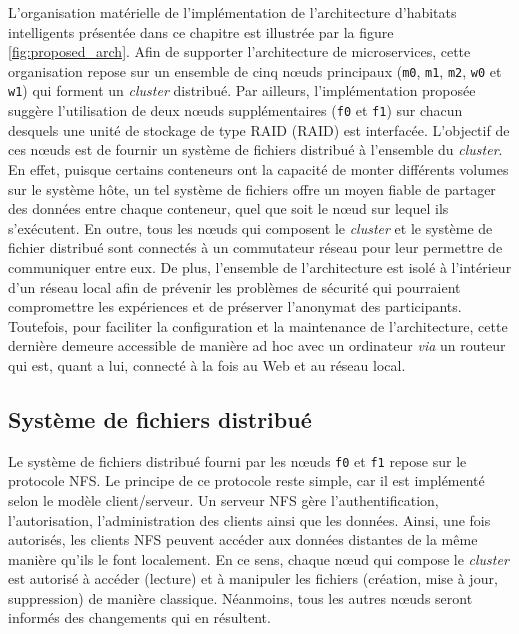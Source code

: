 L'organisation matérielle de l'implémentation de l'architecture d'habitats intelligents présentée dans ce chapitre est illustrée par la figure \ref{fig:proposed_arch}. Afin de supporter l'architecture de microservices, cette organisation repose sur un ensemble de cinq n\oe{}uds principaux (\texttt{m0}, \texttt{m1}, \texttt{m2}, \texttt{w0} et \texttt{w1}) qui forment un \textit{cluster} distribué. Par ailleurs, l'implémentation proposée suggère l'utilisation de deux n\oe{}uds supplémentaires (\texttt{f0} et \texttt{f1}) sur chacun desquels une unité de stockage de type \acs{RAID} (\acl{RAID}) est interfacée. L'objectif de ces n\oe{}uds est de fournir un système de fichiers distribué à l'ensemble du \textit{cluster}. En effet, puisque certains conteneurs ont la capacité de monter différents volumes sur le système hôte, un tel système de fichiers offre un moyen fiable de partager des données entre chaque conteneur, quel que soit le n\oe{}ud sur lequel ils s'exécutent. En outre, tous les n\oe{}uds qui composent le \textit{cluster} et le système de fichier distribué sont connectés à un commutateur réseau pour leur permettre de communiquer entre eux. De plus, l'ensemble de l'architecture est isolé à l'intérieur d'un réseau local afin de prévenir les problèmes de sécurité qui pourraient compromettre les expériences et de préserver l'anonymat des participants. Toutefois, pour faciliter la configuration et la maintenance de l'architecture, cette dernière demeure accessible de manière ad hoc avec un ordinateur \textit{via} un routeur qui est, quant a lui, connecté à la fois au Web et au réseau local.

\subsection{Système de fichiers distribué}

Le système de fichiers distribué fourni par les n\oe{}uds \texttt{f0} et \texttt{f1} repose sur le protocole \ac{NFS}. Le principe de ce protocole reste simple, car il est implémenté selon le modèle client/serveur. Un serveur \acs{NFS} gère l'authentification, l'autorisation, l'administration des clients ainsi que les données. Ainsi, une fois autorisés, les clients NFS peuvent accéder aux données distantes de la même manière qu'ils le font localement. En ce sens, chaque n\oe{}ud qui compose le \textit{cluster} est autorisé à accéder (lecture) et à manipuler les fichiers (création, mise à jour, suppression) de manière classique. Néanmoins, tous les autres n\oe{}uds seront informés des changements qui en résultent.

